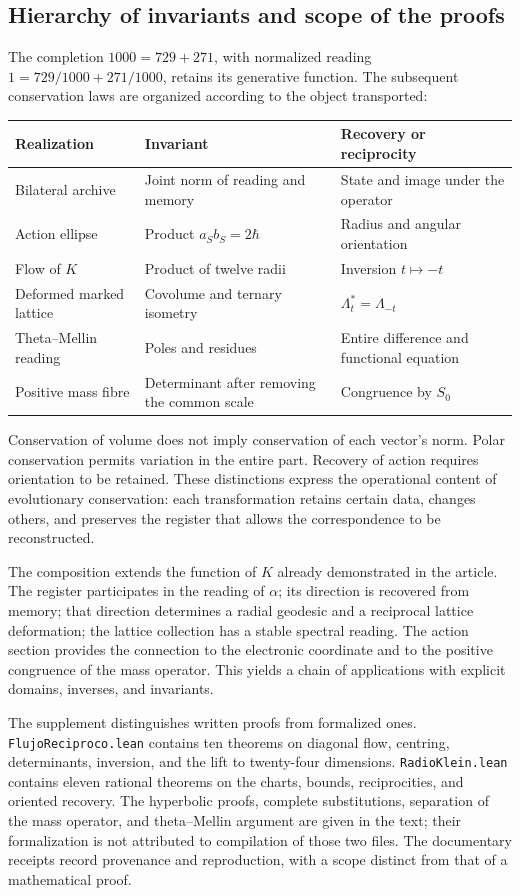 \subsection{Hierarchy of invariants and scope of the proofs}

The completion \(1000=729+271\), with normalized reading \(1=729/1000+271/1000\), retains its generative function. The subsequent conservation laws are organized according to the object transported:
\begin{center}
\small
\begin{tabularx}{\linewidth}{@{}p{.27\linewidth}Xp{.25\linewidth}@{}}
\toprule
Realization & Invariant & Recovery or reciprocity\\
\midrule
Bilateral archive & Joint norm of reading and memory & State and image under the operator\\
Action ellipse & Product \(a_Sb_S=2\hbar\) & Radius and angular orientation\\
Flow of \(K\) & Product of twelve radii & Inversion \(t\mapsto-t\)\\
Deformed marked lattice & Covolume and ternary isometry & \(\Lambda_t^*=\Lambda_{-t}\)\\
Theta--Mellin reading & Poles and residues & Entire difference and functional equation\\
Positive mass fibre & Determinant after removing the common scale & Congruence by \(S_0\)\\
\bottomrule
\end{tabularx}
\end{center}

Conservation of volume does not imply conservation of each vector's norm. Polar conservation permits variation in the entire part. Recovery of action requires orientation to be retained. These distinctions express the operational content of evolutionary conservation: each transformation retains certain data, changes others, and preserves the register that allows the correspondence to be reconstructed.

The composition extends the function of \(K\) already demonstrated in the article. The register participates in the reading of \(\alpha\); its direction is recovered from memory; that direction determines a radial geodesic and a reciprocal lattice deformation; the lattice collection has a stable spectral reading. The action section provides the connection to the electronic coordinate and to the positive congruence of the mass operator. This yields a chain of applications with explicit domains, inverses, and invariants.

The supplement distinguishes written proofs from formalized ones. \texttt{FlujoReciproco.lean} contains ten theorems on diagonal flow, centring, determinants, inversion, and the lift to twenty-four dimensions. \texttt{RadioKlein.lean} contains eleven rational theorems on the charts, bounds, reciprocities, and oriented recovery. The hyperbolic proofs, complete substitutions, separation of the mass operator, and theta--Mellin argument are given in the text; their formalization is not attributed to compilation of those two files. The documentary receipts record provenance and reproduction, with a scope distinct from that of a mathematical proof.
